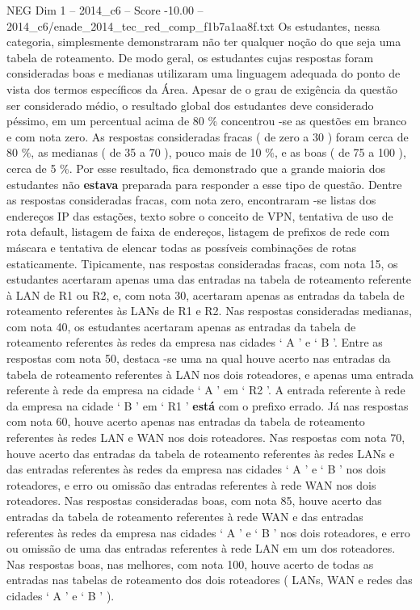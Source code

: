 \begin{textsample}{NEG Dim 1 – 2014\_c6 – Score -10.00 – 2014\_c6/enade\_2014\_tec\_red\_comp\_f1b7a1aa8f.txt}
Os estudantes, nessa categoria, simplesmente demonstraram não ter qualquer noção do que seja uma tabela de roteamento.
De modo geral, os estudantes cujas respostas foram consideradas boas e medianas utilizaram uma linguagem adequada do ponto de vista dos termos específicos da Área.
Apesar de o grau de exigência da questão ser considerado médio, o resultado global dos estudantes deve considerado péssimo, em um percentual acima de 80 \% concentrou -se as questões em branco e com nota zero.
As respostas consideradas fracas ( de zero a 30 ) foram cerca de 80 \%, as medianas ( de 35 a 70 ), pouco mais de 10 \%, e as boas ( de 75 a 100 ), cerca de 5 \%.
Por esse resultado, fica demonstrado que a grande maioria dos estudantes não \textbf{estava} preparada para responder a esse tipo de questão.
Dentre as respostas consideradas fracas, com nota zero, encontraram -se listas dos endereços IP das estações, texto sobre o conceito de VPN, tentativa de uso de rota default, listagem de faixa de endereços, listagem de prefixos de rede com máscara e tentativa de elencar todas as possíveis combinações de rotas estaticamente.
Tipicamente, nas respostas consideradas fracas, com nota 15, os estudantes acertaram apenas uma das entradas na tabela de roteamento referente à LAN de R1 ou R2, e, com nota 30, acertaram apenas as entradas da tabela de roteamento referentes às LANs de R1 e R2.
Nas respostas consideradas medianas, com nota 40, os estudantes acertaram apenas as entradas da tabela de roteamento referentes às redes da empresa nas cidades ‘ A ’ e ‘ B ’.
Entre as respostas com nota 50, destaca -se uma na qual houve acerto nas entradas da tabela de roteamento referentes à LAN nos dois roteadores, e apenas uma entrada referente à rede da empresa na cidade ‘ A ’ em ‘ R2 ’.
A entrada referente à rede da empresa na cidade ‘ B ’ em ‘ R1 ’ \textbf{está} com o prefixo errado.
Já nas respostas com nota 60, houve acerto apenas nas entradas da tabela de roteamento referentes às redes LAN e WAN nos dois roteadores.
Nas respostas com nota 70, houve acerto das entradas da tabela de roteamento referentes às redes LANs e das entradas referentes às redes da empresa nas cidades ‘ A ’ e ‘ B ’ nos dois roteadores, e erro ou omissão das entradas referentes à rede WAN nos dois roteadores.
Nas respostas consideradas boas, com nota 85, houve acerto das entradas da tabela de roteamento referentes à rede WAN e das entradas referentes às redes da empresa nas cidades ‘ A ’ e ‘ B ’ nos dois roteadores, e erro ou omissão de uma das entradas referentes à rede LAN em um dos roteadores.
Nas respostas boas, nas melhores, com nota 100, houve acerto de todas as entradas nas tabelas de roteamento dos dois roteadores ( LANs, WAN e redes das cidades ‘ A ’ e ‘ B ’ ).

\end{textsample}
